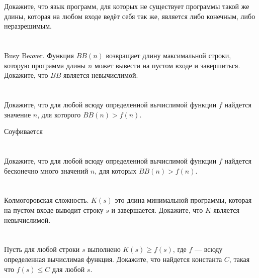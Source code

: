 \section{}
Докажите, что язык программ, для которых не существует программы такой же длины, которая на любом входе ведёт себя так же, является либо конечным, либо неразрешимым.

\section{}
Busy Beaver. Функция $BB(n)$ возвращает длину максимальной строки, которую программа длины $n$ может вывести на пустом входе и завершиться. Докажите, что $BB$ является невычислимой.

\section{}
Докажите, что для любой всюду определенной вычислимой функции $f$ найдется значение $n$, для которого $BB(n) > f(n)$.

Соуфивается

\section{}
Докажите, что для любой всюду определенной вычислимой функции $f$ найдется бесконечно много значений $n$, для которых $BB(n) > f(n)$.

\section{}
Колмогоровская сложность. $K(s)$ это длина минимальной программы, которая на пустом входе выводит строку $s$ и завершается. Докажите, что $K$ является невычислимой.

\section{}
Пусть для любой строки $s$ выполнено $K(s) \ge f(s)$, где $f$ — всюду определенная вычислимая функция. Докажите, что найдется константа $C$, такая что $f(s) \le C$ для любой $s$.


